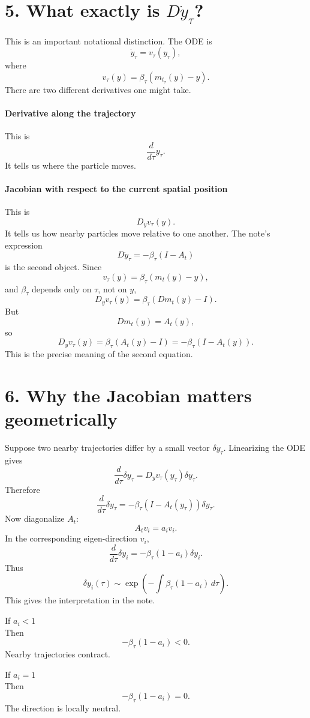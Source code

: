 \documentclass{article}
\begin{document}
\section*{5. What exactly is $D\dot y_\tau$?}
This is an important notational distinction.
The ODE is
\[
\dot y_\tau = v_\tau(y_\tau),
\]
where
\[
v_\tau(y) = \beta_\tau(m_{t_\tau}(y)-y).
\]
There are two different derivatives one might take.

\paragraph{Derivative along the trajectory}
This is
\[
\frac{d}{d\tau}y_\tau.
\]
It tells us where the particle moves.

\paragraph{Jacobian with respect to the current spatial position}
This is
\[
D_y v_\tau(y).
\]
It tells us how nearby particles move relative to one another.
The note's expression
\[
D\dot y_\tau = -\beta_\tau(I-A_t)
\]
is the second object.
Since
\[
v_\tau(y) = \beta_\tau(m_t(y)-y),
\]
and $\beta_\tau$ depends only on $\tau$, not on $y$,
\[
D_y v_\tau(y) = \beta_\tau(Dm_t(y)-I).
\]
But
\[
Dm_t(y) = A_t(y),
\]
so
\[
\boxed{
D_y v_\tau(y) = \beta_\tau(A_t(y)-I) = -\beta_\tau(I-A_t(y)).
}
\]
This is the precise meaning of the second equation.

\section*{6. Why the Jacobian matters geometrically}
Suppose two nearby trajectories differ by a small vector $\delta y_\tau$.
Linearizing the ODE gives
\[
\frac{d}{d\tau}\delta y_\tau = D_y v_\tau(y_\tau)\delta y_\tau.
\]
Therefore
\[
\boxed{
\frac{d}{d\tau}\delta y_\tau = -\beta_\tau(I-A_t(y_\tau))\delta y_\tau.
}
\]
Now diagonalize $A_t$:
\[
A_t v_i = a_i v_i.
\]
In the corresponding eigen-direction $v_i$,
\[
\frac{d}{d\tau}\delta y_i = -\beta_\tau(1-a_i)\delta y_i.
\]
Thus
\[
\boxed{
\delta y_i(\tau) \sim \exp\left(-\int \beta_\tau(1-a_i)\,d\tau\right).
}
\]
This gives the interpretation in the note.

If $a_i < 1$ \\
Then
\[
-\beta_\tau(1-a_i) < 0.
\]
Nearby trajectories contract.

If $a_i = 1$ \\
Then
\[
-\beta_\tau(1-a_i) = 0.
\]
The direction is locally neutral.
\end{document}
